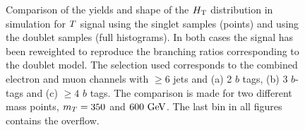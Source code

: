 \begin{figure}[htbp]
\begin{center}
\caption{
Comparison of the yields and shape of the $\HT$ distribution in simulation for 
$\T$ signal using the singlet samples (points) and
using the doublet samples (full histograms). In both 
cases the signal has been reweighted to reproduce the 
branching ratios corresponding 
to the doublet model. The selection used corresponds 
to the combined electron and muon channels
with $\geq 6$ jets and (a) 2 $b$ tags,  (b) 3 $b$-tags 
and (c) $\geq 4$ $b$ tags. The comparison is made for two 
different mass points, $m_{\T}=350$ and $600\gev$.
The last bin in all figures contains the overflow.
\label{fig:HT_checks_SingletvsDoubletComp}}
\end{center}
\end{figure}



